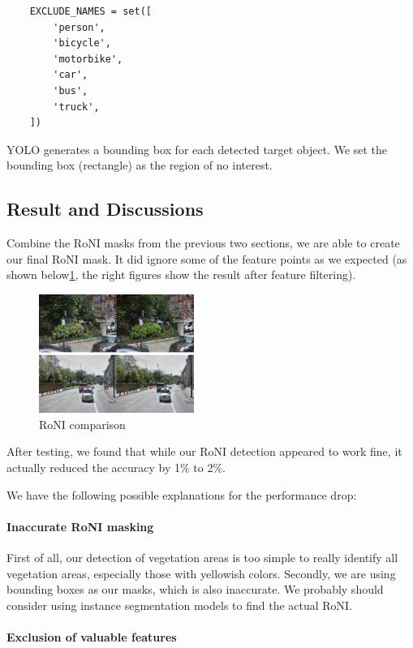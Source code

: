\documentclass[conference]{IEEEtran}
\begin{document}
\begin{verbatim}
    EXCLUDE_NAMES = set([
        'person',
        'bicycle',
        'motorbike',
        'car',
        'bus',
        'truck',
    ])
\end{verbatim}

YOLO generates a bounding box for each detected target object. We set the bounding box (rectangle) as the region of no interest.

\subsection{Result and Discussions}

Combine the RoNI masks from the previous two sections, we are able to create our final RoNI mask. It did ignore some of the feature points as we expected (as shown below\ref{fig:3}, the right figures show the result after feature filtering).

\begin{figure}[H]
    \centering
    \includegraphics[width=0.45\textwidth]{fig_3.png}
    \caption{RoNI comparison}
    \label{fig:3}
\end{figure}

After testing, we found that while our RoNI detection appeared to work fine, it actually reduced the accuracy by 1\% to 2\%.

We have the following possible explanations for the performance drop:

\paragraph{Inaccurate RoNI masking}

First of all, our detection of vegetation areas is too simple to really identify all vegetation areas, especially those with yellowish colors. Secondly, we are using bounding boxes as our masks, which is also inaccurate. We probably should consider using instance segmentation models to find the actual RoNI.

\paragraph{Exclusion of valuable features}
\end{document}
